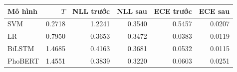 \begin{tabular}{lrrrrr}\toprule
Mô hình & $T$ & NLL trước & NLL sau & ECE trước & ECE sau\\\midrule
SVM & 0.2718 & 1.2241 & 0.3540 & 0.5457 & 0.0207\\
LR & 0.7950 & 0.3653 & 0.3472 & 0.0383 & 0.0119\\
BiLSTM & 1.4685 & 0.4163 & 0.3681 & 0.0532 & 0.0115\\
PhoBERT & 1.4551 & 0.3839 & 0.3220 & 0.0603 & 0.0251\\
\bottomrule\end{tabular}
